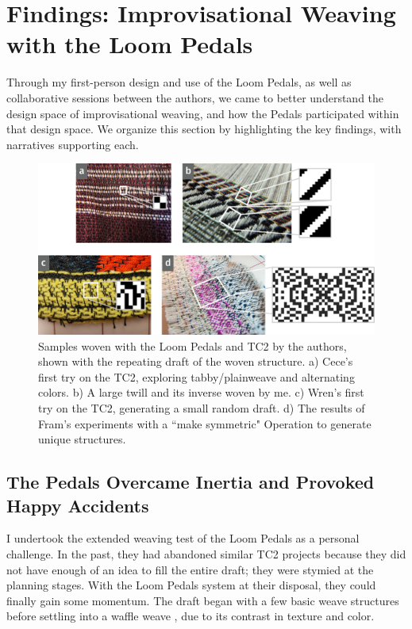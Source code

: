 \section{Findings: Improvisational Weaving with the Loom Pedals}

Through my first-person design and use of the Loom Pedals, as well as collaborative sessions between the authors, we came to better understand the design space of improvisational weaving, and how the Pedals participated within that design space. We organize this section by highlighting the key findings, with narratives supporting each.

\begin{figure}
    \centering
    \includegraphics[width=\linewidth]{figs/LP_author-samples.png}
    \caption[Samples woven with the Loom Pedals and TC2.]{Samples woven with the Loom Pedals and TC2 by the authors, shown with the repeating draft of the woven structure. a) Cece’s first try on the TC2, exploring tabby/plainweave and alternating colors. b) A large twill and its inverse woven by me. c) Wren’s first try on the TC2, generating a small random draft. d) The results of Fram’s experiments with a ``make symmetric" Operation to generate unique structures.}
    \label{fig:author-samples}
\end{figure}

\subsection{The Pedals Overcame Inertia and Provoked Happy Accidents}

I undertook the extended weaving test of the Loom Pedals as a personal challenge. In the past, they had abandoned similar TC2 projects because they did not have enough of an idea to fill the entire draft; they were stymied at the planning stages. With the Loom Pedals system at their disposal, they could finally gain some momentum. The draft began with a few basic weave structures before settling into a waffle weave
, due to its contrast in texture and color. 

